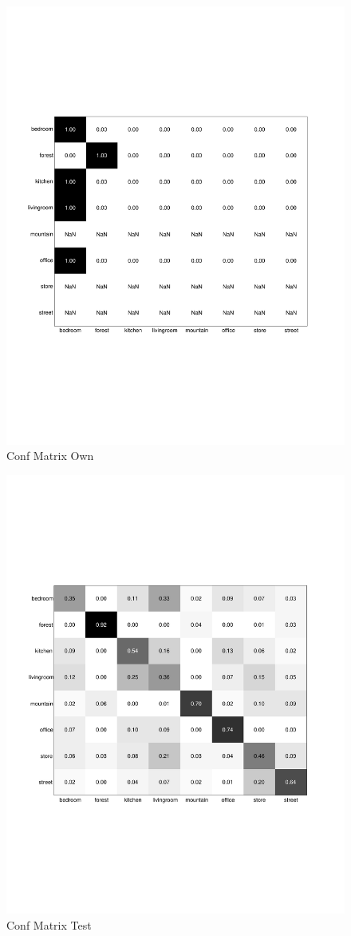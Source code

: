 \documentclass[subfigure,epsfig,fleqn,float,numbers=noenddot]{scrartcl}
\begin{document}
\begin{figure}
		\centering
		\includegraphics[width=\textwidth]{img/conf_matrix_own.pdf}
		\caption{Conf Matrix Own}
		\label{fig:conf_matrix_own}
\end{figure}
\begin{figure}
		\centering
		\includegraphics[width=\textwidth]{img/conf_matrix_test.pdf}
		\caption{Conf Matrix Test}
		\label{fig:conf_matrix_test}
\end{figure}
\end{document}
